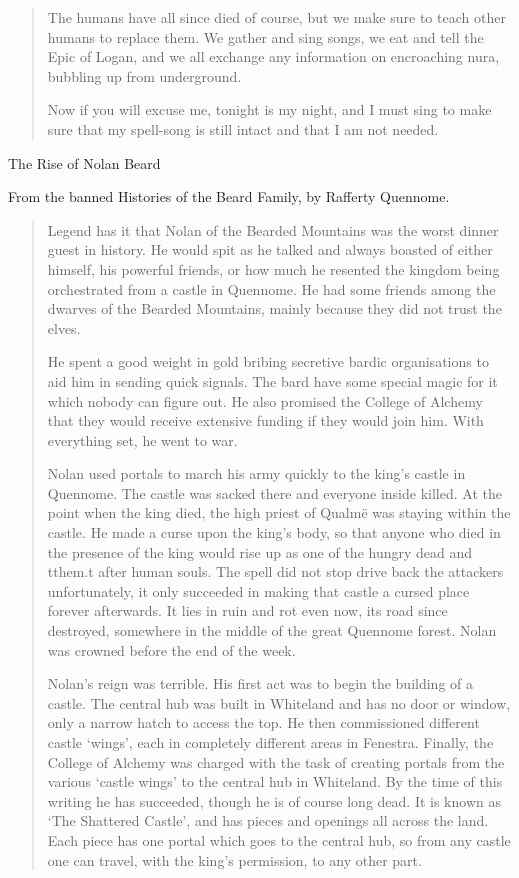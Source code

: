 \begin{quotation}
	The humans have all since died of course, but we make sure to teach other humans to replace them.  We gather and sing songs, we eat and tell the Epic of Logan, and we all exchange any information on encroaching nura, bubbling up from underground.

	Now if you will excuse me, tonight is my night, and I must sing to make sure that my spell-song is still intact and that I am not needed.

\end{quotation}

The Rise of Nolan Beard

From the banned Histories of the Beard Family, by Rafferty Quennome.

\begin{quotation}

	Legend has it that Nolan of the Bearded Mountains was the worst dinner guest in history.  He would spit as he talked and always boasted of either himself, his powerful friends, or how much he resented the kingdom being orchestrated from a castle in Quennome.  He had some friends among the dwarves of the Bearded Mountains, mainly because they did not trust the elves.

	He spent a good weight in gold bribing secretive bardic organisations to aid him in sending quick signals.  The bard have some special magic for it which nobody can figure out.  He also promised the College of Alchemy that they would receive extensive funding if they would join him.  With everything set, he went to war.

	Nolan used portals to march his army quickly to the king's castle in Quennome.  The castle was sacked there and everyone inside killed.  At the point when the king died, the high priest of Qualm\"{e} was staying within the castle.  He made a curse upon the king's body, so that anyone who died in the presence of the king would rise up as one of the hungry dead and tthem.t after human souls.  The spell did not stop drive back the attackers unfortunately, it only succeeded in making that castle a cursed place forever afterwards.  It lies in ruin and rot even now, its road since destroyed, somewhere in the middle of the great Quennome forest.  Nolan was crowned before the end of the week.

	Nolan's reign was terrible.  His first act was to begin the building of a castle.  The central hub was built in Whiteland and has no door or window, only a narrow hatch to access the top.  He then commissioned different castle `wings', each in completely different areas in Fenestra.  Finally, the College of Alchemy was charged with the task of creating portals from the various `castle wings' to the central hub in Whiteland.  By the time of this writing he has succeeded, though he is of course long dead.  It is known as `The Shattered Castle', and has pieces and openings all across the land.  Each piece has one portal which goes to the central hub, so from any castle one can travel, with the king's permission, to any other part.


\end{quotation}
